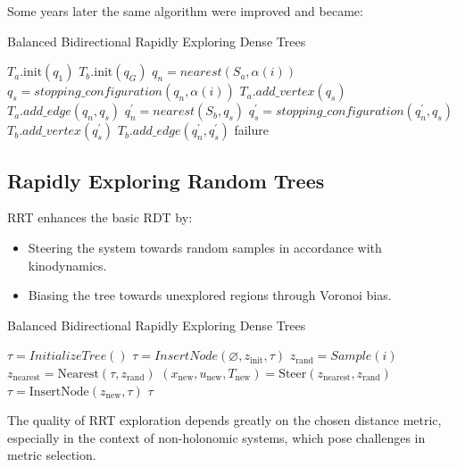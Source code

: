 Some years later the same algorithm were improved and became: 
\begin{algorithm}[H]
    \caption{Balanced Bidirectional Rapidly Exploring Dense Trees}
        \begin{algorithmic}[1]
            \State $T_a.\text{init}(q_1)$
            \State $T_b.\text{init}(q_G)$
                \State $q_n=nearest(S_a, \alpha(i))$
                \State $q_s=stopping\_configuration(q_n, \alpha(i))$
                    \State $T_a.add\_vertex(q_s)$
                    \State $T_a.add\_edge(q_n, q_s)$
                    \State $q_n^{\prime} =nearest(S_b, q_s)$
                    \State $q_s^{\prime} =stopping\_configuration(q_n^{\prime}, q_s)$
                        \State $T_b.add\_vertex(q_s^{\prime})$
                        \State $T_b.add\_edge(q_n^{\prime}, q_s^{\prime})$
                    \EndIf
                        \State{}
                    \EndIf
                \EndIf
                \EndIf
            \EndFor
            \State \Return failure
        \end{algorithmic}
\end{algorithm}


\subsection{Rapidly Exploring Random Trees}
RRT enhances the basic RDT by:
\begin{itemize}
    \item Steering the system towards random samples in accordance with kinodynamics.
    \item Biasing the tree towards unexplored regions through Voronoi bias.
\end{itemize}

\begin{algorithm}[H]
    \caption{Balanced Bidirectional Rapidly Exploring Dense Trees}
        \begin{algorithmic}[1]
            \State $\tau=InitializeTree()$
            \State $\tau=InsertNode(\varnothing, z_{\text{init}}, \tau)$
                \State $z_{\text{rand}} = Sample(i)$
                \State $z_{\text{nearest}} = \text{Nearest}(\tau, z_{\text{rand}})$
                \State $(x_{\text{new}}, u_{\text{new}}, T_{\text{new}}) = \text{Steer}(z_{\text{nearest}}, z_{\text{rand}})$
                    \State $\tau = \text{InsertNode}(z_{\text{new}}, \tau)$
                \EndIf
            \EndFor
            \State \Return $\tau$
        \end{algorithmic}
\end{algorithm}
The quality of RRT exploration depends greatly on the chosen distance metric, especially in the context of non-holonomic systems, which pose challenges in metric selection.


